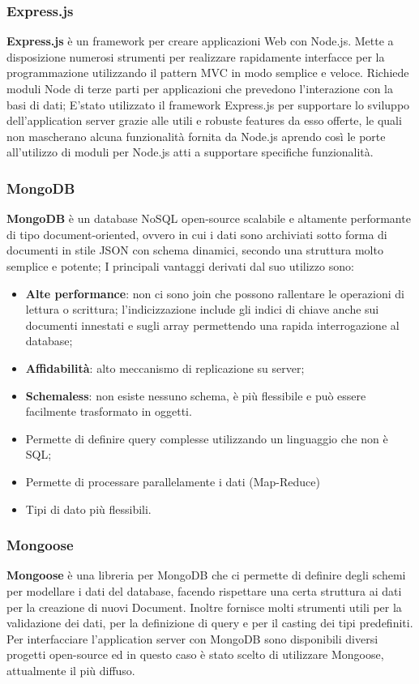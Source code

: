 \subsubsection{Express.js}
\textbf{Express.js} è un framework per creare applicazioni Web con Node.js.
Mette a disposizione numerosi strumenti per realizzare rapidamente interfacce per la programmazione utilizzando il pattern MVC in modo semplice e veloce. Richiede moduli Node di terze parti per applicazioni che prevedono l’interazione con la basi di dati; \newline
E'stato utilizzato il framework Express.js per supportare lo sviluppo dell'application server grazie alle utili e robuste features da esso offerte, le quali non mascherano alcuna funzionalità fornita da Node.js aprendo così le porte all'utilizzo di moduli per Node.js atti a supportare specifiche
funzionalità.

\subsubsection{MongoDB}
\textbf{MongoDB} è un database NoSQL open-source scalabile e altamente performante di tipo document-oriented, ovvero in cui i dati sono archiviati sotto forma di documenti in stile JSON con schema dinamici, secondo una struttura molto semplice e potente;
I principali vantaggi derivati dal suo utilizzo sono:
\begin{itemize}
	\item \textbf{Alte performance}: non ci sono join che possono rallentare le operazioni di lettura o scrittura; l’indicizzazione include gli indici di chiave anche sui documenti innestati e sugli array permettendo una rapida interrogazione al database;
	\item \textbf{Affidabilità}: alto meccanismo di replicazione su server;
	\item \textbf{Schemaless}: non esiste nessuno schema, è più flessibile e può essere facilmente trasformato in oggetti.	
	\item Permette di definire query complesse utilizzando un linguaggio che non è SQL;
	\item Permette di processare parallelamente i dati (Map-Reduce)
	\item Tipi di dato più flessibili.
\end{itemize}

\subsubsection{Mongoose}
\textbf{Mongoose} è una libreria per MongoDB che ci permette di definire degli schemi per modellare i dati del database, facendo rispettare una certa struttura ai dati per la creazione di nuovi Document. Inoltre fornisce molti strumenti utili per la validazione dei dati, per la definizione di query e per il casting dei tipi predefiniti. \newline
Per interfacciare l'application server con MongoDB sono disponibili diversi progetti open-source ed in questo caso è stato scelto di utilizzare Mongoose, attualmente il più diffuso.	

